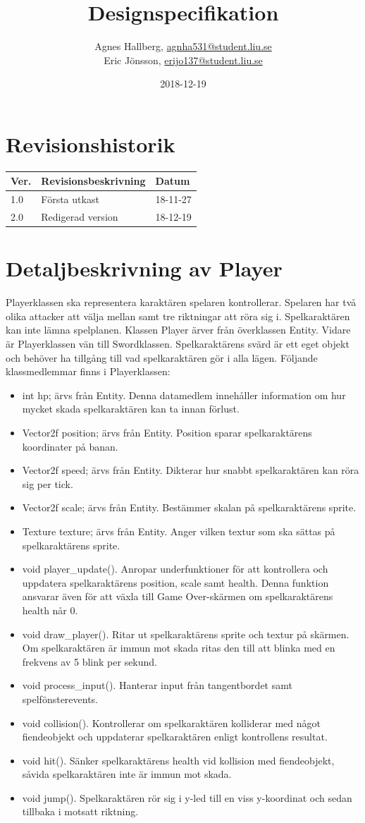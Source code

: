 \documentclass{TDP005mall}
\author{Agnes Hallberg, \url{agnha531@student.liu.se}\\
  Eric Jönsson, \url{erijo137@student.liu.se}}
\title{Designspecifikation}
\date{2018-12-19}
\begin{document}
\projectpage

\section*{Revisionshistorik}
\begin{table}[!h]
\begin{tabularx}{\linewidth}{|l|X|l|}
\hline
Ver. & Revisionsbeskrivning & Datum \\\hline
1.0 & Första utkast  & 18-11-27 \\\hline
2.0 & Redigerad version & 18-12-19 \\\hline
\end{tabularx}
\end{table}

\section{Detaljbeskrivning av Player}
Playerklassen ska representera karaktären spelaren kontrollerar. Spelaren har två olika attacker att välja mellan samt tre riktningar att röra sig i. Spelkaraktären kan inte lämna spelplanen. Klassen Player ärver från överklassen Entity. Vidare är Playerklassen vän till Swordklassen. Spelkaraktärens svärd är ett eget objekt och behöver ha tillgång till vad spelkaraktären gör i alla lägen. Följande klassmedlemmar finns i Playerklassen:
\begin{itemize}
\item int hp; ärvs från Entity. Denna datamedlem innehåller information om hur mycket skada spelkaraktären kan ta innan förlust.
\item Vector2f position; ärvs från Entity. Position sparar spelkaraktärens koordinater på banan.
\item Vector2f speed; ärvs från Entity. Dikterar hur snabbt spelkaraktären kan röra sig per tick.
\item Vector2f scale; ärvs från Entity. Bestämmer skalan på spelkaraktärens sprite.
\item Texture texture; ärvs från Entity. Anger vilken textur som ska sättas på spelkaraktärens sprite.
\item void player\_update(). Anropar underfunktioner för att kontrollera och uppdatera spelkaraktärens position, scale samt health. Denna funktion ansvarar även för att växla till Game Over-skärmen om spelkaraktärens health når 0.
\item void draw\_player(). Ritar ut spelkaraktärens sprite och textur på skärmen. Om spelkaraktären är immun mot skada ritas den till att blinka med en frekvens av 5 blink per sekund.
\item void process\_input(). Hanterar input från tangentbordet samt spelfönsterevents.
\item void collision(). Kontrollerar om spelkaraktären kolliderar med något fiendeobjekt och uppdaterar spelkaraktären enligt kontrollens resultat.
\item void hit(). Sänker spelkaraktärens health vid kollision med fiendeobjekt, såvida spelkaraktären inte är immun mot skada.
\item void jump(). Spelkaraktären rör sig i y-led till en viss y-koordinat och sedan tillbaka i motsatt riktning.
\end{itemize}
\end{document}
